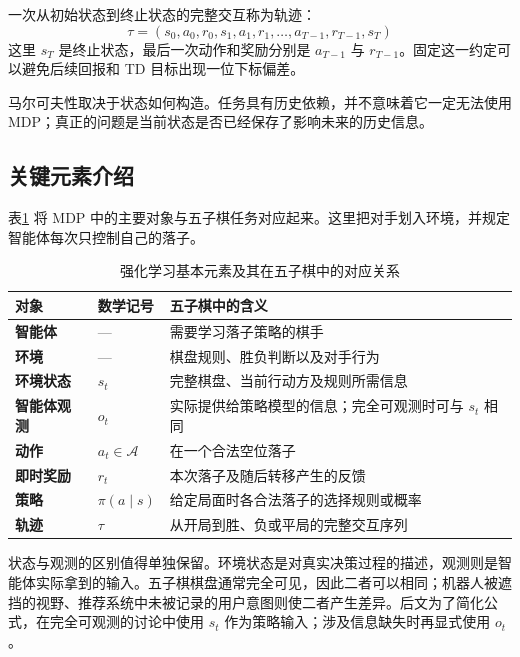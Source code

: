 \documentclass[UTF8,a4paper,zihao=-4,oneside,openany]{ctexbook}
\begin{document}
一次从初始状态到终止状态的完整交互称为轨迹：
\begin{equation}
\tau=(s_0,a_0,r_0,s_1,a_1,r_1,\ldots,a_{T-1},r_{T-1},s_T)
\end{equation}
这里 \(s_T\) 是终止状态，最后一次动作和奖励分别是 \(a_{T-1}\) 与 \(r_{T-1}\)。固定这一约定可以避免后续回报和 TD 目标出现一位下标偏差。

\begin{importantnote}
马尔可夫性取决于状态如何构造。任务具有历史依赖，并不意味着它一定无法使用 MDP；真正的问题是当前状态是否已经保存了影响未来的历史信息。
\end{importantnote}

\subsection{关键元素介绍}

表\ref{tab:rl-elements} 将 MDP 中的主要对象与五子棋任务对应起来。这里把对手划入环境，并规定智能体每次只控制自己的落子。

\begin{table}[htbp]
  \centering
  \caption{强化学习基本元素及其在五子棋中的对应关系}
  \label{tab:rl-elements}
  \begin{tabularx}{\linewidth}{>{\bfseries}p{2.2cm}p{3.2cm}X}
    \toprule
    对象 & 数学记号 & 五子棋中的含义 \\
    \midrule
    智能体 & --- & 需要学习落子策略的棋手 \\
    环境 & --- & 棋盘规则、胜负判断以及对手行为 \\
    环境状态 & $s_t$ & 完整棋盘、当前行动方及规则所需信息 \\
    智能体观测 & $o_t$ & 实际提供给策略模型的信息；完全可观测时可与 $s_t$ 相同 \\
    动作 & $a_t\in\mathcal A$ & 在一个合法空位落子 \\
    即时奖励 & $r_t$ & 本次落子及随后转移产生的反馈 \\
    策略 & $\pi(a\mid s)$ & 给定局面时各合法落子的选择规则或概率 \\
    轨迹 & $\tau$ & 从开局到胜、负或平局的完整交互序列 \\
    \bottomrule
  \end{tabularx}
\end{table}

状态与观测的区别值得单独保留。环境状态是对真实决策过程的描述，观测则是智能体实际拿到的输入。五子棋棋盘通常完全可见，因此二者可以相同；机器人被遮挡的视野、推荐系统中未被记录的用户意图则使二者产生差异。后文为了简化公式，在完全可观测的讨论中使用 \(s_t\) 作为策略输入；涉及信息缺失时再显式使用 \(o_t\)。
\end{document}
